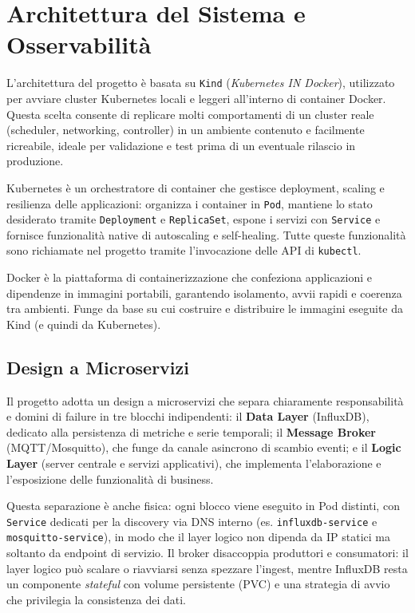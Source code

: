 
\chapter{Architettura del Sistema e Osservabilità}
\label{cap:architettura_osservabilita}

L'architettura del progetto è basata su \texttt{Kind} (\textit{Kubernetes IN Docker}), utilizzato per avviare cluster Kubernetes locali e leggeri all'interno di container Docker. Questa scelta consente di replicare molti comportamenti di un cluster reale (scheduler, networking, controller) in un ambiente contenuto e facilmente ricreabile, ideale per validazione e test prima di un eventuale rilascio in produzione.

Kubernetes è un orchestratore di container che gestisce deployment, scaling e resilienza delle applicazioni: organizza i container in \texttt{Pod}, mantiene lo stato desiderato tramite \texttt{Deployment} e \texttt{ReplicaSet}, espone i servizi con \texttt{Service} e fornisce funzionalità native di autoscaling e self-healing. Tutte queste funzionalità sono richiamate nel progetto tramite l'invocazione delle API di \texttt{kubectl}.

Docker è la piattaforma di containerizzazione che confeziona applicazioni e dipendenze in immagini portabili, garantendo isolamento, avvii rapidi e coerenza tra ambienti. Funge da base su cui costruire e distribuire le immagini eseguite da Kind (e quindi da Kubernetes).

\section{Design a Microservizi}
\label{sec:design_microservizi}

Il progetto adotta un design a microservizi che separa chiaramente responsabilità e domini di failure in tre blocchi indipendenti: il \textbf{Data Layer} (InfluxDB), dedicato alla persistenza di metriche e serie temporali; il \textbf{Message Broker} (MQTT/Mosquitto), che funge da canale asincrono di scambio eventi; e il \textbf{Logic Layer} (server centrale e servizi applicativi), che implementa l'elaborazione e l'esposizione delle funzionalità di business.

Questa separazione è anche fisica: ogni blocco viene eseguito in Pod distinti, con \texttt{Service} dedicati per la discovery via DNS interno (es. \texttt{influxdb-service} e \texttt{mosquitto-service}), in modo che il layer logico non dipenda da IP statici ma soltanto da endpoint di servizio. Il broker disaccoppia produttori e consumatori: il layer logico può scalare o riavviarsi senza spezzare l'ingest, mentre InfluxDB resta un componente \textit{stateful} con volume persistente (PVC) e una strategia di avvio che privilegia la consistenza dei dati.

